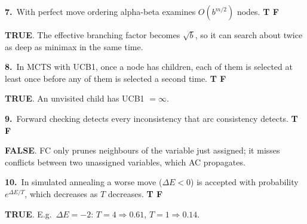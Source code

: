 \documentclass[11pt,a4paper]{article}
\newcommand{\subq}[1]{\par\smallskip\noindent\textbf{#1}\ }
\newcommand{\T}{\textbf{\textcolor{green!45!black}{TRUE}}}
\newcommand{\F}{\textbf{\textcolor{red!70!black}{FALSE}}}
\begin{document}
\subq{7.}With perfect move ordering alpha-beta examines $O(b^{m/2})$ nodes. \hfill \textbf{T \quad F}
\begin{solbox}
\T. The effective branching factor becomes $\sqrt b$, so it can search about twice as deep as minimax in the same time.
\end{solbox}
\subq{8.}In MCTS with UCB1, once a node has children, each of them is selected at least once before any of them is selected a second time. \hfill \textbf{T \quad F}
\begin{solbox}
\T. An unvisited child has UCB1 $=\infty$.
\end{solbox}
\subq{9.}Forward checking detects every inconsistency that arc consistency detects. \hfill \textbf{T \quad F}
\begin{solbox}
\F. FC only prunes neighbours of the variable just assigned; it misses conflicts between two unassigned variables, which AC propagates.
\end{solbox}
\subq{10.}In simulated annealing a worse move ($\Delta E<0$) is accepted with probability $e^{\Delta E/T}$, which decreases as $T$ decreases. \hfill \textbf{T \quad F}
\begin{solbox}
\T. E.g.\ $\Delta E=-2$: $T=4\Rightarrow 0.61$, $T=1\Rightarrow0.14$.
\end{solbox}
\end{document}
